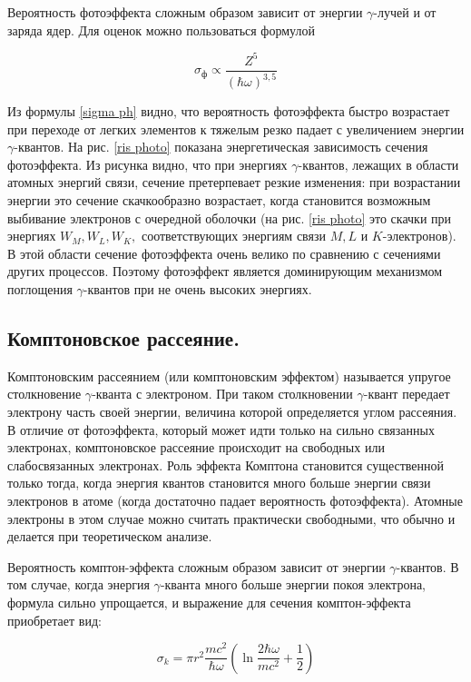 \documentclass[a4paper,12pt]{article} %
\newcommand{\ga}{\ensuremath{\gamma}}
\begin{document}
	Вероятность фотоэффекта сложным образом зависит от энергии
	\ga-лучей и от заряда ядер. Для оценок можно пользоваться формулой
	
	\begin{equation}\label{sigma ph}
		\sigma_{\text{ф}} \propto \dfrac{Z^5}{(\hbar\omega)^{3,5}}
	\end{equation}
	
	Из формулы \eqref{sigma ph} видно, что вероятность фотоэффекта быстро возрастает при переходе от легких элементов к тяжелым резко падает с увеличением энергии \ga-квантов. На рис. \ref{ris photo} показана энергетическая зависимость сечения фотоэффекта. Из рисунка видно, что при энергиях \ga-квантов, лежащих в области атомных энергий связи, сечение претерпевает резкие изменения: при возрастании энергии это сечение скачкообразно возрастает, когда становится возможным выбивание электронов с очередной оболочки (на рис. \ref{ris photo} это скачки при энергиях $ W_M, W_L, W_K, $ соответствующих энергиям связи $ M, L $  и $ K $-электронов). В этой области сечение фотоэффекта очень велико по сравнению с сечениями других процессов. Поэтому фотоэффект является доминирующим механизмом поглощения \ga-квантов при не очень высоких энергиях.
	
	\subsection{Комптоновское рассеяние.} Комптоновским рассеянием (или комптоновским эффектом) называется упругое столкновение \ga-кванта с электроном. При таком столкновении \ga-квант передает электрону часть своей энергии, величина которой определяется углом рассеяния. В отличие от фотоэффекта, который может идти только на сильно связанных электронах, комптоновское рассеяние происходит на свободных или слабосвязанных электронах. Роль эффекта Комптона становится
	существенной только тогда, когда энергия квантов становится много
	больше энергии связи электронов в атоме (когда достаточно падает
	вероятность фотоэффекта). Атомные электроны в этом случае можно
	считать практически свободными, что обычно и делается при теоретическом анализе.
	
	Вероятность комптон-эффекта сложным образом зависит от энергии \ga-квантов. В том случае, когда энергия
	\ga-кванта много больше энергии покоя электрона, формула сильно
	упрощается, и выражение для сечения комптон-эффекта приобретает  вид:
	
	\begin{equation}\label{sigma k}
		\sigma_k = \pi r^2 \dfrac{mc^2}{\hbar\omega} \left( \ln{\dfrac{2\hbar\omega}{mc^2} + \dfrac{1}{2}} \right) 
	\end{equation}
	
\end{document}
